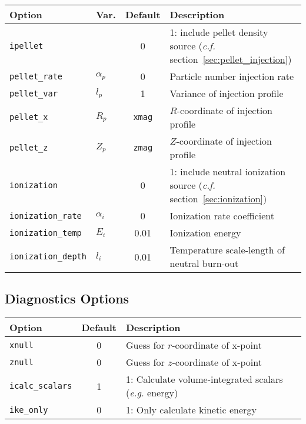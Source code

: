 \documentclass[letterpaper]{book}
\begin{document}
\begin{tabular}{llcp{2in}}
  \textbf{Option}&\textbf{Var.}&\textbf{Default}&\textbf{Description}\\
  \hline
  \texttt{ipellet}      & & 0    & 1: include pellet density
    source (\textit{c.f.} section~\ref{sec:pellet_injection})\\
  \texttt{pellet\_rate} & $\alpha_p$ & 0 
                                     & Particle number injection rate\\
  \texttt{pellet\_var}  & $l_p$      & 1    & Variance of  
                                              injection profile\\
  \texttt{pellet\_x}    & $R_p$      & \texttt{xmag} 
                                     & $R$-coordinate of injection profile\\
  \texttt{pellet\_z}    & $Z_p$      & \texttt{zmag} 
                                     & $Z$-coordinate of injection profile\\
  \texttt{ionization}   & & 0  & 1: include neutral ionization
    source (\textit{c.f.} section~\ref{sec:ionization})\\
  \texttt{ionization\_rate} & $\alpha_i$ & 0 
                                     & Ionization rate coefficient\\
  \texttt{ionization\_temp} & $E_i$   & 0.01 & Ionization energy\\
  \texttt{ionization\_depth}& $l_i$   & 0.01 & Temperature 
    scale-length of neutral burn-out
\end{tabular}


\subsection{Diagnostics Options}

\begin{tabular}{lcp{3in}}
  \textbf{Option}&\textbf{Default}&\textbf{Description}\\
  \hline
  \texttt{xnull}     & 0 & Guess for $r$-coordinate of x-point\\
  \texttt{znull}     & 0 & Guess for $z$-coordinate of x-point\\
  \texttt{icalc\_scalars} & 1 & 1: Calculate volume-integrated scalars 
                                (\textit{e.g.} energy)\\
  \texttt{ike\_only} & 0 & 1: Only calculate kinetic energy
\end{tabular}






\appendix


\end{document}
